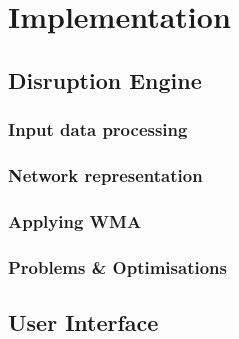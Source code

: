 \chapter{Implementation}

\section{Disruption Engine}
	\subsection{Input data processing}
	\subsection{Network representation}
	\subsection{Applying WMA}
	\subsection{Problems \& Optimisations}
\section{User Interface}
